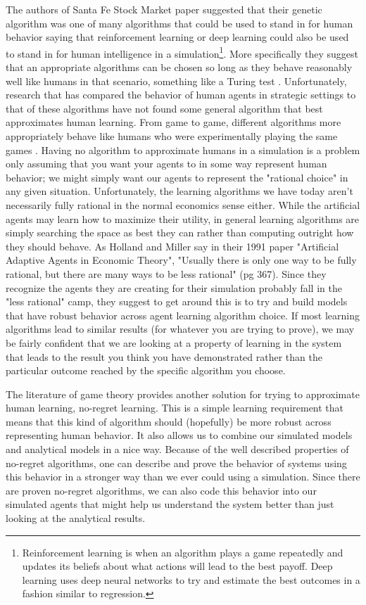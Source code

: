 \documentclass[12pt,twoside]{reedthesis}
\begin{document}
The authors of Santa Fe Stock Market paper suggested that their genetic algorithm was one of many algorithms that could be used to stand in for human behavior saying that reinforcement learning or deep learning could also be used to stand in for human intelligence in a simulation\footnote{Reinforcement learning is when an algorithm plays a game repeatedly and updates its beliefs about what actions will lead to the best payoff. Deep learning uses deep neural networks to try and estimate the best outcomes in a fashion similar to regression.}. More specifically they suggest that an appropriate algorithms can be chosen so long as they behave reasonably well like humans in that scenario, something like a Turing test \citep{Arthur1991}.  Unfortunately, research that has compared the behavior of human agents in strategic settings to that of these algorithms have not found some general algorithm that best approximates human learning. From game to game, different algorithms more appropriately behave like humans who were experimentally playing the same games \citep{Tesfatsion2002}. Having no algorithm to approximate humans in a simulation is a problem only assuming that you want your agents to in some way represent human behavior; we might simply want our agents to represent the "rational choice" in any given situation. Unfortunately, the learning algorithms we have today aren't necessarily fully rational in the normal economics sense either. While the artificial agents may learn how to maximize their utility, in general learning algorithms are simply searching the space as best they can rather than computing outright how they should behave. As Holland and Miller say in their 1991 paper "Artificial Adaptive Agents in Economic Theory", "Usually there is only one way to be fully rational, but there are many ways to be less rational" (pg 367). Since they recognize the agents they are creating for their simulation probably fall in the "less rational" camp, they suggest to get around this is to try and build models that have robust behavior across agent learning algorithm choice. If most learning algorithms lead to similar results (for whatever you are trying to prove), we may be fairly confident that we are looking at a property of learning in the system that leads to the result you think you have demonstrated rather than the particular outcome reached by the specific algorithm you choose.


The literature of game theory provides another solution for trying to approximate human learning, no-regret learning. This is a simple learning requirement that means that this kind of algorithm should (hopefully) be more robust across representing human behavior. It also allows us to combine our simulated models and analytical models in a nice way. Because of the well described properties of no-regret algorithms, one can describe and prove the behavior of systems using this behavior in a stronger way than we ever could using a simulation. Since there are proven no-regret algorithms, we can also code this behavior into our simulated agents that might help us understand the system better than just looking at the analytical results.
\end{document}
